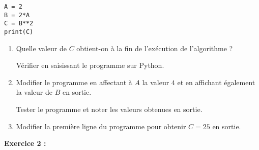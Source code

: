 \medskip

\begin{center}
\begin{minipage}{4cm}
\begin{lstlisting}
A = 2
B = 2*A
C = B**2
print(C)
\end{lstlisting}
\end{minipage}
\end{center}

\begin{enumerate}
\item Quelle valeur de $ C $ obtient-on à la fin de l'exécution de l'algorithme ? 

      Vérifier en saisissant le programme sur Python.
\item Modifier le programme en affectant à $A$ la valeur $4$ et en affichant également la valeur de $B$ en sortie. 
      
      Tester le programme et noter les valeurs obtenues en sortie.
\item Modifier la première ligne du programme pour obtenir $C = 25$ en sortie.
\end{enumerate}

\textbf{Exercice 2 :}

